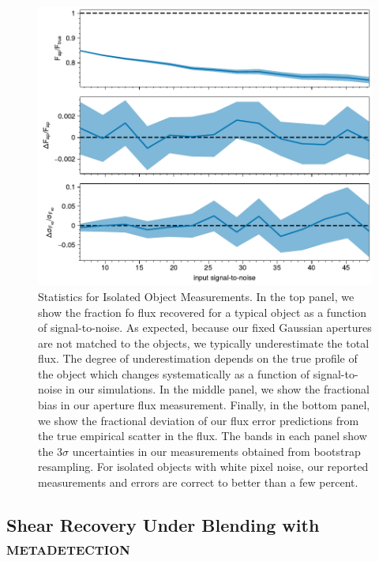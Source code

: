 \documentclass[twocolappendix, appendixfloats, numberedappendix, twocolumn, apj]{openjournal}
\newcommand{\mdet}{\textsc{metadetection}\xspace}
\begin{document}
\begin{figure}
    \includegraphics[width=\columnwidth]{figures/test-noround-nodetect.pdf}

    \caption{
      Statistics for Isolated Object Measurements. In the top panel, we show the
      fraction fo flux recovered for a typical object as a function of signal-to-noise.
      As expected, because our fixed Gaussian apertures are not matched to the objects,
      we typically underestimate the total flux. The degree of underestimation depends on
      the true profile of the object which changes systematically as a function of
      signal-to-noise in our simulations. In the middle panel, we show the fractional bias in
      our aperture flux measurement. Finally, in the bottom panel,
      we show the fractional deviation of our flux error predictions from the true
      empirical scatter in the flux. The bands in each panel show the $3\sigma$ uncertainties
      in our measurements obtained from bootstrap resampling. For isolated objects
      with white pixel noise, our reported measurements and errors are correct to
      better than a few percent.
      \label{fig:noround_nodetect}
    }

\end{figure}


\subsection{Shear Recovery Under Blending with \mdet}
\end{document}

